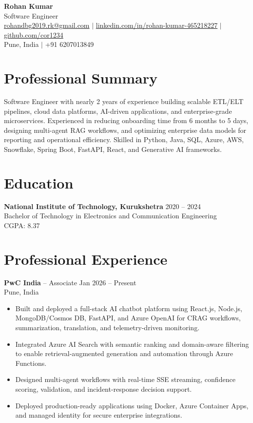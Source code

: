 \documentclass[11pt,a4paper]{article}
\begin{document}
\begin{center}
    {\LARGE \bfseries Rohan Kumar}\\[4pt]
    \small Software Engineer\\
    \href{mailto:rohandbg2019.rk@gmail.com}{rohandbg2019.rk@gmail.com} $\mid$
    \href{https://www.linkedin.com/in/rohan-kumar-465218227/}{linkedin.com/in/rohan-kumar-465218227} $\mid$
    \href{https://github.com/cor1234}{github.com/cor1234}\\
    Pune, India $\mid$ +91 6207013849
\end{center}

\section*{Professional Summary}
Software Engineer with nearly 2 years of experience building scalable ETL/ELT pipelines, cloud data platforms, AI-driven applications, and enterprise-grade microservices. Experienced in reducing onboarding time from 6 months to 5 days, designing multi-agent RAG workflows, and optimizing enterprise data models for reporting and operational efficiency. Skilled in Python, Java, SQL, Azure, AWS, Snowflake, Spring Boot, FastAPI, React, and Generative AI frameworks.

\section*{Education}
\textbf{National Institute of Technology, Kurukshetra} \hfill 2020 -- 2024\\
Bachelor of Technology in Electronics and Communication Engineering\\
CGPA: 8.37

\section*{Professional Experience}
\textbf{PwC India} -- Associate \hfill Jan 2026 -- Present\\
Pune, India
\begin{itemize}
    \item Built and deployed a full-stack AI chatbot platform using React.js, Node.js, MongoDB/Cosmos DB, FastAPI, and Azure OpenAI for CRAG workflows, summarization, translation, and telemetry-driven monitoring.
    \item Integrated Azure AI Search with semantic ranking and domain-aware filtering to enable retrieval-augmented generation and automation through Azure Functions.
    \item Designed multi-agent workflows with real-time SSE streaming, confidence scoring, validation, and incident-response decision support.
    \item Deployed production-ready applications using Docker, Azure Container Apps, and managed identity for secure enterprise integrations.
\end{itemize}
\end{document}
